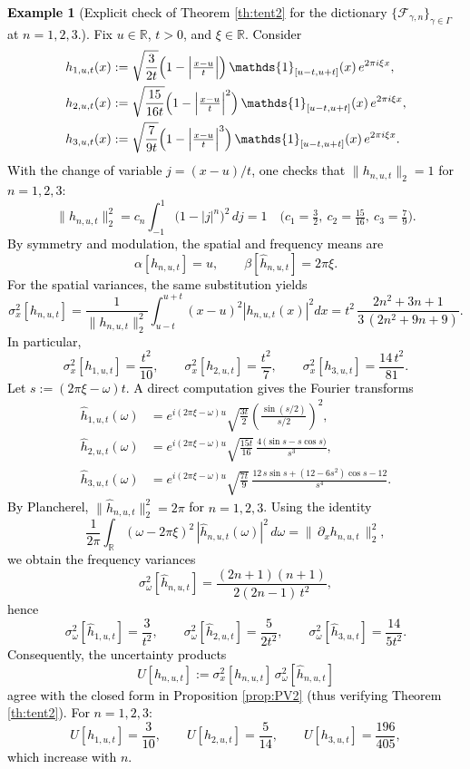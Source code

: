 \documentclass[preprint,hidelinks,authoryear]{elsarticle}
\theoremstyle{plain}
\theoremstyle{definition}
\newtheorem{example}[theorem]{Example}
\theoremstyle{remark}
\begin{document}
\textcolor{black}{\begin{example}[Explicit check of Theorem \ref{th:tent2} for the dictionary $\{\mathcal{F}_{\gamma,n}\}_{\gamma\in\Gamma}$ at $n=1,2,3$.]
Fix $u\in\mathbb{R}$, $t>0$, and $\xi\in\mathbb{R}$. Consider
\begin{align*}
h_{1,u,t}(x)&:=\sqrt{\frac{3}{2t}}\Bigl(1-\Bigl|\tfrac{x-u}{t}\Bigr|\Bigr)\,\mathds{1}_{[u-t,u+t]}(x)\,e^{2\pi i\xi x},\\
h_{2,u,t}(x)&:=\sqrt{\frac{15}{16t}}\Bigl(1-\Bigl|\tfrac{x-u}{t}\Bigr|^{2}\Bigr)\,\mathds{1}_{[u-t,u+t]}(x)\,e^{2\pi i\xi x},\\
h_{3,u,t}(x)&:=\sqrt{\frac{7}{9t}}\Bigl(1-\Bigl|\tfrac{x-u}{t}\Bigr|^{3}\Bigr)\,\mathds{1}_{[u-t,u+t]}(x)\,e^{2\pi i\xi x}.
\end{align*}
With the change of variable $j=(x-u)/t$, one checks that $\|h_{n,u,t}\|_{2}=1$ for $n=1,2,3$:
$$
\|h_{n,u,t}\|_{2}^{2}=c_n\int_{-1}^{1}\!\bigl(1-|j|^{n}\bigr)^{2}\,dj=1
\quad\bigl(c_1=\tfrac{3}{2},~c_2=\tfrac{15}{16},~c_3=\tfrac{7}{9}\bigr).
$$
By symmetry and modulation, the spatial and frequency means are
$$
\alpha[h_{n,u,t}]=u,\qquad \beta[\widehat{h}_{n,u,t}]=2\pi\xi.
$$
For the spatial variances, the same substitution yields
$$
\sigma_x^{2}[h_{n,u,t}]
=\frac{1}{\|h_{n,u,t}\|_{2}^{2}}\int_{u-t}^{u+t}(x-u)^{2}|h_{n,u,t}(x)|^{2}dx
= t^{2}\,\frac{2n^{2}+3n+1}{3\,(2n^{2}+9n+9)}.
$$
In particular,
$$
\sigma_x^{2}[h_{1,u,t}]=\frac{t^{2}}{10},\qquad
\sigma_x^{2}[h_{2,u,t}]=\frac{t^{2}}{7},\qquad
\sigma_x^{2}[h_{3,u,t}]=\frac{14\,t^{2}}{81}.
$$
Let $s:=(2\pi\xi-\omega)t$. A direct computation gives the Fourier transforms
\begin{align*}
\widehat{h}_{1,u,t}(\omega)
&=e^{i(2\pi\xi-\omega)u}\sqrt{\frac{3t}{2}}\left(\frac{\sin(s/2)}{s/2}\right)^{2},\\[2mm]
\widehat{h}_{2,u,t}(\omega)
&=e^{i(2\pi\xi-\omega)u}\sqrt{\frac{15t}{16}}\,
\frac{4\,\bigl(\sin s - s\cos s\bigr)}{s^{3}},\\[2mm]
\widehat{h}_{3,u,t}(\omega)
&=e^{i(2\pi\xi-\omega)u}\sqrt{\frac{7t}{9}}\,
\frac{12\,s\sin s+(12-6s^{2})\cos s -12}{s^{4}}.
\end{align*}
By Plancherel, $\|\widehat{h}_{n,u,t}\|_{2}^{2}=2\pi$ for $n=1,2,3$. Using the identity
$$
\frac{1}{2\pi}\int_{\mathbb{R}}(\omega-2\pi\xi)^{2}\,|\widehat{h}_{n,u,t}(\omega)|^{2}\,d\omega
=\bigl\|\,\partial_x h_{n,u,t}\,\bigr\|_{2}^{2},
$$
we obtain the frequency variances
$$
\sigma_{\omega}^{2}[\widehat{h}_{n,u,t}]
=\frac{(2n+1)(n+1)}{2(2n-1)\,t^{2}},
$$
hence
$$
\sigma_{\omega}^{2}[\widehat{h}_{1,u,t}]=\frac{3}{t^{2}},\qquad
\sigma_{\omega}^{2}[\widehat{h}_{2,u,t}]=\frac{5}{2t^{2}},\qquad
\sigma_{\omega}^{2}[\widehat{h}_{3,u,t}]=\frac{14}{5t^{2}}.
$$
Consequently, the uncertainty products
$$
U[h_{n,u,t}]:=\sigma_x^{2}[h_{n,u,t}]\,\sigma_{\omega}^{2}[\widehat{h}_{n,u,t}]
$$
agree with the closed form in Proposition \ref{prop:PV2} (thus verifying Theorem \ref{th:tent2}). For $n=1,2,3$:
$$
U[h_{1,u,t}]=\frac{3}{10},\qquad
U[h_{2,u,t}]=\frac{5}{14},\qquad
U[h_{3,u,t}]=\frac{196}{405},
$$
which increase with $n$.
\end{example}}
\end{document}
